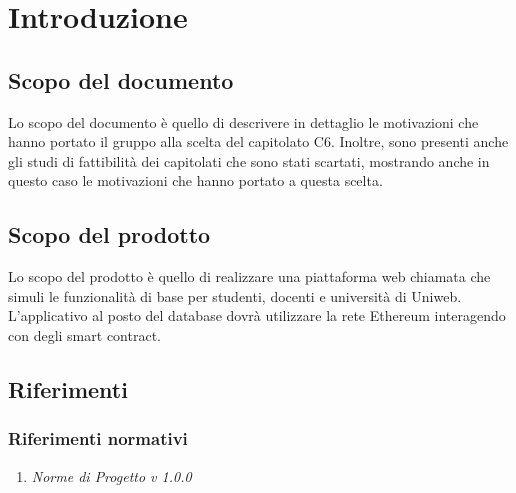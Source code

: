 \documentclass[StudioDiFattibilità.tex]{subfiles}
\begin{document}
\chapter{Introduzione}
\section{Scopo del documento}
Lo scopo del documento è quello di descrivere in dettaglio le motivazioni che hanno portato il gruppo alla scelta del capitolato C6. Inoltre, sono presenti anche gli studi di fattibilità dei capitolati che sono stati scartati, mostrando anche in questo caso le motivazioni che hanno portato a questa scelta.
\section{Scopo del prodotto}
Lo scopo del prodotto è quello di realizzare una piattaforma web chiamata \progetto che simuli le funzionalità di base per studenti, docenti e università di Uniweb. L'applicativo al posto del database dovrà utilizzare la rete Ethereum interagendo con degli smart contract.

\glossExpl

\section{Riferimenti}
\subsection{Riferimenti normativi}
\begin{enumerate}
	\item \textit{Norme di Progetto v 1.0.0}
\end{enumerate}
\end{document}
